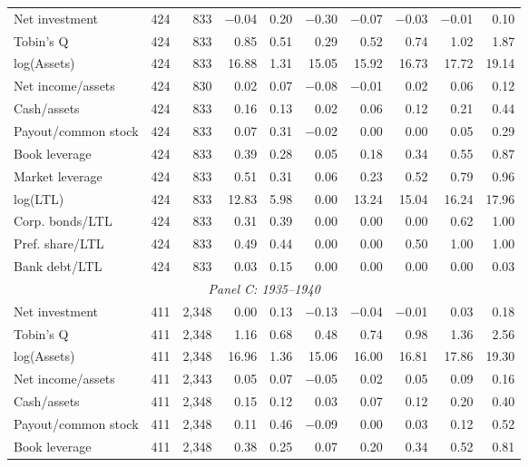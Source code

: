\begin{table}[p]
\begin{threeparttable}
\begin{tabular}{lrrrrrrrrr}
            \midrule
            Net investment & 424 & 833 & $-$0.04 & 0.20 & $-$0.30 & $-$0.07 & $-$0.03 & $-$0.01 & 0.10 \\
            Tobin's Q & 424 & 833 & 0.85 & 0.51 & 0.29 & 0.52 & 0.74 & 1.02 & 1.87 \\
            log(Assets) & 424 & 833 & 16.88 & 1.31 & 15.05 & 15.92 & 16.73 & 17.72 & 19.14 \\
            Net income/assets & 424 & 830 & 0.02 & 0.07 & $-$0.08 & $-$0.01 & 0.02 & 0.06 & 0.12 \\
            Cash/assets & 424 & 833 & 0.16 & 0.13 & 0.02 & 0.06 & 0.12 & 0.21 & 0.44 \\
            Payout/common stock & 424 & 833 & 0.07 & 0.31 & $-$0.02 & 0.00 & 0.00 & 0.05 & 0.29 \\
            Book leverage & 424 & 833 & 0.39 & 0.28 & 0.05 & 0.18 & 0.34 & 0.55 & 0.87 \\
            Market leverage & 424 & 833 & 0.51 & 0.31 & 0.06 & 0.23 & 0.52 & 0.79 & 0.96 \\
            log(LTL) & 424 & 833 & 12.83 & 5.98 & 0.00 & 13.24 & 15.04 & 16.24 & 17.96 \\
            Corp. bonds/LTL & 424 & 833 & 0.31 & 0.39 & 0.00 & 0.00 & 0.00 & 0.62 & 1.00 \\
            Pref. share/LTL & 424 & 833 & 0.49 & 0.44 & 0.00 & 0.00 & 0.50 & 1.00 & 1.00 \\
            Bank debt/LTL & 424 & 833 & 0.03 & 0.15 & 0.00 & 0.00 & 0.00 & 0.00 & 0.03 \\
            \midrule
            \multicolumn{10}{c}{\textit{Panel C: 1935--1940}} \\
            \midrule
            Net investment & 411 & 2,348 & 0.00 & 0.13 & $-$0.13 & $-$0.04 & $-$0.01 & 0.03 & 0.18 \\
            Tobin's Q & 411 & 2,348 & 1.16 & 0.68 & 0.48 & 0.74 & 0.98 & 1.36 & 2.56 \\
            log(Assets) & 411 & 2,348 & 16.96 & 1.36 & 15.06 & 16.00 & 16.81 & 17.86 & 19.30 \\
            Net income/assets & 411 & 2,343 & 0.05 & 0.07 & $-$0.05 & 0.02 & 0.05 & 0.09 & 0.16 \\
            Cash/assets & 411 & 2,348 & 0.15 & 0.12 & 0.03 & 0.07 & 0.12 & 0.20 & 0.40 \\
            Payout/common stock & 411 & 2,348 & 0.11 & 0.46 & $-$0.09 & 0.00 & 0.03 & 0.12 & 0.52 \\
            Book leverage & 411 & 2,348 & 0.38 & 0.25 & 0.07 & 0.20 & 0.34 & 0.52 & 0.81 \\

\end{tabular}
\end{threeparttable}
\end{table}
